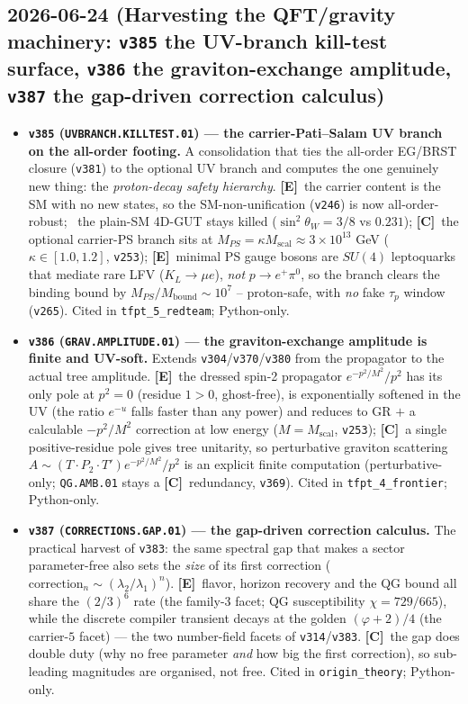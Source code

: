 \documentclass[11pt]{article}
\providecommand{\mE}{\textbf{[E]}}\providecommand{\mC}{\textbf{[C]}}
\providecommand{\vref}[1]{\texttt{#1}}
\begin{document}
\subsection*{2026-06-24 (Harvesting the QFT/gravity machinery: \texttt{v385} the UV-branch kill-test surface, \texttt{v386} the graviton-exchange amplitude, \texttt{v387} the gap-driven correction calculus)}
\begin{itemize}
\item \textbf{\texttt{v385} (\texttt{UVBRANCH.KILLTEST.01}) --- the carrier-Pati--Salam UV branch on the all-order footing.}
A consolidation that ties the all-order EG/BRST closure (\vref{v381}) to the optional UV branch and computes the
one genuinely new thing: the \emph{proton-decay safety hierarchy}. \mE\ the carrier content is the SM with no new
states, so the SM-non-unification (\vref{v246}) is now all-order-robust; \mX\ the plain-SM 4D-GUT stays killed
($\sin^2\theta_W=3/8$ vs $0.231$); \mC\ the optional carrier-PS branch sits at $M_{PS}=\kappa M_{\mathrm{scal}}\approx
3\times10^{13}$ GeV ($\kappa\in[1.0,1.2]$, \vref{v253}); \mE\ minimal PS gauge bosons are $SU(4)$ leptoquarks that
mediate rare LFV ($K_L\to\mu e$), \emph{not} $p\to e^+\pi^0$, so the branch clears the binding bound by
$M_{PS}/M_{\mathrm{bound}}\sim10^7$ -- proton-safe, with \emph{no} fake $\tau_p$ window (\vref{v265}). Cited in
\texttt{tfpt\_5\_redteam}; Python-only.
\item \textbf{\texttt{v386} (\texttt{GRAV.AMPLITUDE.01}) --- the graviton-exchange amplitude is finite and UV-soft.}
Extends \vref{v304}/\vref{v370}/\vref{v380} from the propagator to the actual tree amplitude. \mE\ the dressed spin-2
propagator $e^{-p^2/M^2}/p^2$ has its only pole at $p^2=0$ (residue $1>0$, ghost-free), is exponentially softened in
the UV (the ratio $e^{-u}$ falls faster than any power) and reduces to GR $+$ a calculable $-p^2/M^2$ correction at
low energy ($M=M_{\mathrm{scal}}$, \vref{v253}); \mC\ a single positive-residue pole gives tree unitarity, so
perturbative graviton scattering $A\sim(T{\cdot}P_2{\cdot}T')e^{-p^2/M^2}/p^2$ is an explicit finite computation
(perturbative-only; \texttt{QG.AMB.01} stays a \mC\ redundancy, \vref{v369}). Cited in \texttt{tfpt\_4\_frontier};
Python-only.
\item \textbf{\texttt{v387} (\texttt{CORRECTIONS.GAP.01}) --- the gap-driven correction calculus.}
The practical harvest of \vref{v383}: the same spectral gap that makes a sector parameter-free also sets the
\emph{size} of its first correction ($\mathrm{correction}_n\sim(\lambda_2/\lambda_1)^n$). \mE\ flavor, horizon
recovery and the QG bound all share the $(2/3)^6$ rate (the family-$3$ facet; QG susceptibility
$\chi=729/665$), while the discrete compiler transient decays at the golden $(\varphi+2)/4$ (the carrier-$5$ facet)
--- the two number-field facets of \vref{v314}/\vref{v383}. \mC\ the gap does double duty (why no free parameter
\emph{and} how big the first correction), so sub-leading magnitudes are organised, not free. Cited in
\texttt{origin\_theory}; Python-only.
\end{itemize}
\end{document}
